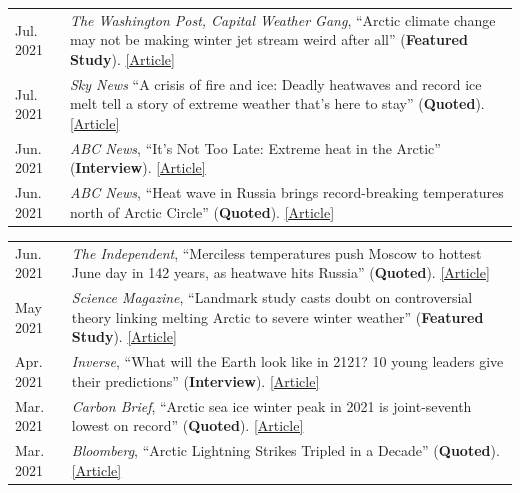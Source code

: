 \documentclass[margin,line,palatino,courier,10pt]{res}
\begin{document}
\begin{resume}
\begin{tabular}{@{}p{0.9in}p{4in}}
Jul. 2021 & \textit{The Washington Post, Capital Weather Gang}, ``Arctic climate change may not be making winter jet stream weird after all'' (\textbf{Featured Study}). \href{https://www.washingtonpost.com/weather/2021/07/31/arctic-climate-change-jetstream-winter/}{[Article]}\\
Jul. 2021 & \textit{Sky News} ``A crisis of fire and ice: Deadly heatwaves and record ice melt tell a story of extreme weather that’s here to stay'' (\textbf{Quoted}). \href{https://news.sky.com/story/climate-change-as-fire-rages-across-the-us-and-canada-ice-retreats-off-the-coast-of-siberia-12359277}{[Article]}\\
Jun. 2021 & \textit{ABC News}, ``It’s Not Too Late: Extreme heat in the Arctic'' (\textbf{Interview}). \href{https://abcnews.go.com/International/video/late-extreme-heat-arctic-78501037}{[Article]}\\
Jun. 2021 & \textit{ABC News}, ``Heat wave in Russia brings record-breaking temperatures north of Arctic Circle'' (\textbf{Quoted}). \href{https://abcnews.go.com/International/heat-wave-russia-brings-record-breaking-temperatures-north/story?id=78446355}{[Article]}\\
\end{tabular}
\begin{tabular}{@{}p{0.9in}p{4in}}
Jun. 2021 & \textit{The Independent}, ``Merciless temperatures push Moscow to hottest June day in 142 years, as heatwave hits Russia'' (\textbf{Quoted}). \href{https://www.independent.co.uk/climate-change/news/moscow-record-temperature-arctic-heatwave-b1871351.html}{[Article]}\\
May 2021 & \textit{Science Magazine}, ``Landmark study casts doubt on controversial theory linking melting Arctic to severe winter weather'' (\textbf{Featured Study}). \href{https://www.sciencemag.org/news/2021/05/landmark-study-casts-doubt-controversial-theory-linking-melting-arctic-severe-winter}{[Article]}\\
Apr. 2021 & \textit{Inverse}, ``What will the Earth look like in 2121? 10 young leaders give their predictions'' (\textbf{Interview}). \href{https://www.inverse.com/science/the-future-of-earth-needs-them}{[Article]}\\
Mar. 2021 & \textit{Carbon Brief}, ``Arctic sea ice winter peak in 2021 is joint-seventh lowest on record'' (\textbf{Quoted}). \href{https://www.carbonbrief.org/arctic-sea-ice-winter-peak-in-2021-is-joint-seventh-lowest-on-record}{[Article]}\\
Mar. 2021 & \textit{Bloomberg}, ``Arctic Lightning Strikes Tripled in a Decade'' (\textbf{Quoted}). \href{https://www.bloomberg.com/news/articles/2021-03-23/arctic-lightning-tripled-in-a-decade-climate-change-may-be-to-blame}{[Article]}\\

\end{tabular}
\end{resume}
\end{document}
